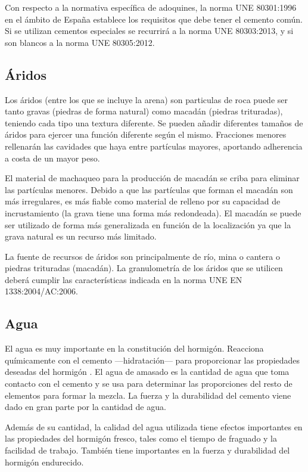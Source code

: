 Con respecto a la normativa específica de adoquines, la norma UNE 80301:1996 \cite{une80301} en el ámbito de España establece los requisitos que debe tener el cemento común. Si se utilizan cementos especiales se recurrirá a la norma UNE 80303:2013, y si son blancos a la norma UNE 80305:2012.

\subsection{Áridos}
Los áridos (entre los que se incluye la arena) son particulas de roca puede ser tanto gravas (piedras de forma natural) como macadán (piedras trituradas), teniendo cada tipo una textura diferente. Se pueden añadir diferentes tamaños de áridos para ejercer una función diferente según el mismo. Fracciones menores rellenarán las cavidades que haya entre partículas mayores, aportando adherencia a costa de un mayor peso.

El material de machaqueo para la producción de macadán se criba para eliminar las partículas menores. Debido a que las partículas que forman el macadán son más irregulares, es más fiable como material de relleno por su capacidad de incrustamiento (la grava tiene una forma más redondeada). El macadán se puede ser utilizado de forma más generalizada en función de la localización ya que la grava natural es un recurso más limitado.

La fuente de recursos de áridos son principalmente de río, mina o cantera o piedras trituradas (macadán). La granulometría de los áridos que se utilicen deberá cumplir las características indicada en la norma UNE EN 1338:2004/AC:2006.

\subsection{Agua}
El agua es muy importante en la constitución del hormigón. Reacciona químicamente con el cemento —hidratación— para proporcionar las propiedades deseadas del hormigón \cite{nrmca}. El agua de amasado es la cantidad de agua que toma contacto con el cemento y se usa para determinar las proporciones del resto de elementos para formar la mezcla. La fuerza y la durabilidad del cemento viene dado en gran parte por la cantidad de agua.

Además de su cantidad, la calidad del agua utilizada tiene efectos importantes en las propiedades del hormigón fresco, tales como el tiempo de fraguado y la facilidad de trabajo. También tiene importantes en la fuerza y durabilidad del hormigón endurecido.

